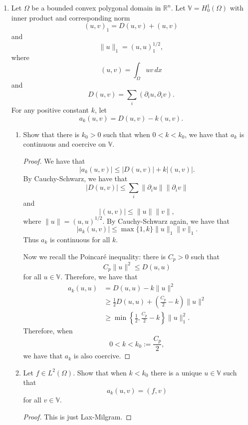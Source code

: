 \documentclass{article}
\begin{document}
\begin{enumerate}
	\item
	      Let $\Omega$ be a bounded convex polygonal domain in $\mathbb R^n$.
	      Let $\mathbb V = H_0^1(\Omega)$ with inner product and corresponding norm \[(u,v)_1 = D(u,v) + (u,v)\] and \[\|u\|_1 = (u,u)_1^{1/2},\] where \[(u,v) = \int_\Omega uv\,dx\] and \[D(u,v) = \sum_i (\partial_i u, \partial_i v).\]
	      For any positive constant $k$, let \[a_k(u,v) = D(u,v) - k(u,v).\]
	      \begin{enumerate}
		      \item
		            Show that there is $k_0 > 0$ such that when $0 < k < k_0$, we have that $a_k$ is continuous and coercive on $\mathbb V$.
		            \begin{proof}
			            We have that \[|a_k(u,v)| \leq |D(u,v)| + k|(u,v)|.\]
			            By Cauchy-Schwarz, we have that \[|D(u,v)| \leq \sum_i\|\partial_iu\|\|\partial_iv\|\] and \[|(u,v)| \leq \|u\|\|v\|,\] where $\|u\| = (u,u)^{1/2}.$
			            By Cauchy-Schwarz again, we have that \[|a_k(u,v)| \leq \max\{1,k\}\|u\|_1\|v\|_1.\]
			            Thus $a_k$ is continuous for all $k$.

			            Now we recall the Poincar\'e inequality: there is $C_p > 0$ such that \[C_p\|u\|^2 \leq D(u,u)\] for all $u \in \mathbb V$.
			            Therefore, we have that
			            \begin{align*}
				            a_k(u,u) & = D(u,u) - k\|u\|^2                                           \\
				                     & \geq \frac{1}{2}D(u,u) + \left(\frac{C_p}{2}-k\right)\|u\|^2  \\
				                     & \geq \min\left\{\frac{1}{2},\frac{C_p}{2}-k\right\}\|u\|_1^2.
			            \end{align*}
			            Therefore, when \[0 < k < k_0 := \frac{C_p}{2},\]
			            we have that $a_k$ is also coercive.
		            \end{proof}

		      \item
		            Let $f \in L^2(\Omega)$.
		            Show that when $k < k_0$ there is a unique $u \in \mathbb V$ such that \[a_k(u,v) = (f,v)\] for all $v \in \mathbb V$.
		            \begin{proof}
			            This is just Lax-Milgram.
		            \end{proof}


\end{enumerate}
\end{enumerate}
\end{document}
